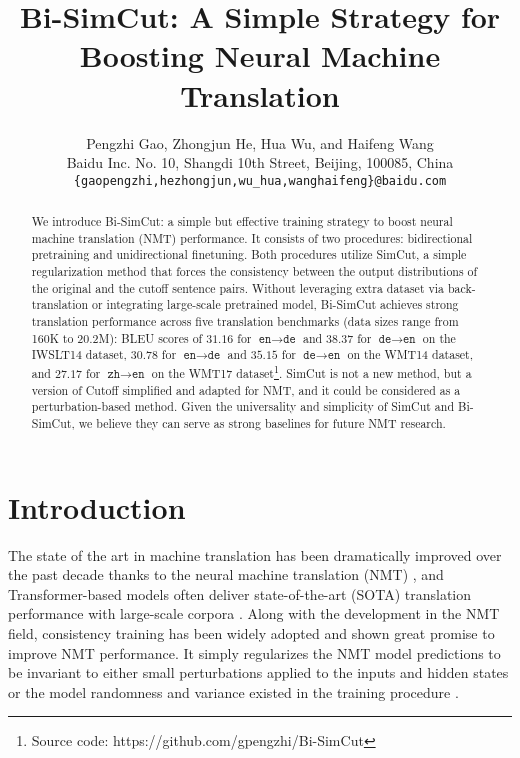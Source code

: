 \documentclass[11pt]{article}
\title{Bi-SimCut: A Simple Strategy for Boosting Neural Machine Translation}
\author{Pengzhi Gao, Zhongjun He, Hua Wu, and Haifeng Wang \\
Baidu Inc. No. 10, Shangdi 10th Street, Beijing, 100085, China \\
\texttt{\{gaopengzhi,hezhongjun,wu\_hua,wanghaifeng\}@baidu.com} 
}
\begin{document}
\maketitle


\begin{abstract}
We introduce Bi-SimCut: a simple but effective training strategy to boost neural machine translation (NMT) performance. It consists of two procedures: bidirectional pretraining and unidirectional finetuning. Both procedures utilize SimCut, a simple regularization method that forces the consistency between the output distributions of the original and the cutoff sentence pairs. Without leveraging extra dataset via back-translation or integrating large-scale pretrained model, Bi-SimCut achieves strong translation performance across five translation benchmarks (data sizes range from 160K to 20.2M): BLEU scores of $31.16$ for $\texttt{en}\rightarrow\texttt{de}$ and $38.37$ for $\texttt{de}\rightarrow\texttt{en}$ on the IWSLT14 dataset, $30.78$ for $\texttt{en}\rightarrow\texttt{de}$ and $35.15$ for $\texttt{de}\rightarrow\texttt{en}$ on the WMT14 dataset, and $27.17$ for $\texttt{zh}\rightarrow\texttt{en}$ on the WMT17 dataset\footnote{Source code: https://github.com/gpengzhi/Bi-SimCut}. SimCut is not a new method, but a version of Cutoff \cite{shen2020simple} simplified and adapted for NMT, and it could be considered as a perturbation-based method. Given the universality and simplicity of SimCut and Bi-SimCut, we believe they can serve as strong baselines for future NMT research.
\end{abstract}


\section{Introduction}

The state of the art in machine translation has been dramatically improved over the past decade thanks to the neural machine translation (NMT) \cite{wu2016google}, and Transformer-based models \cite{vaswani2017attention} often deliver state-of-the-art (SOTA) translation performance with large-scale corpora \cite{ott2018scaling}.
Along with the development in the NMT field, consistency training \cite{bachman2014learning} has been widely adopted and shown great promise to improve NMT performance. It simply regularizes the NMT model predictions to be invariant to either small perturbations applied to the inputs \cite{sano2019effective,shen2020simple} and hidden states \cite{chen2021manifold} or the model randomness and variance existed in the training procedure \cite{liang2021r}. 
\end{document}
